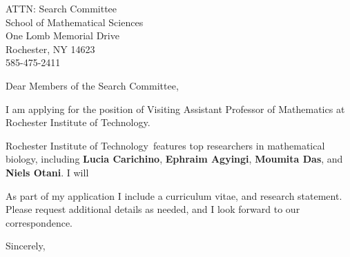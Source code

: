 \documentclass[11pt,a4paper]{letter}
\begin{document}

\def\School{Rochester Institute of Technology}

\begin{letter}
{ATTN: Search Committee\\
School of Mathematical Sciences\\
One Lomb Memorial Drive\\
Rochester, NY 14623\\
585-475-2411
}


\opening{Dear Members of the Search Committee,}

I am applying for the position of Visiting Assistant Professor of Mathematics at \School. 



\School~features top researchers in mathematical biology, including \textbf{Lucia Carichino}, \textbf{Ephraim Agyingi}, \textbf{Moumita Das}, and \textbf{Niels Otani}. I will 



As part of my application I include a curriculum vitae, and research statement. Please request additional details as needed, and I look forward to our correspondence.

\closing{Sincerely,}
\end{letter}
\end{document}
